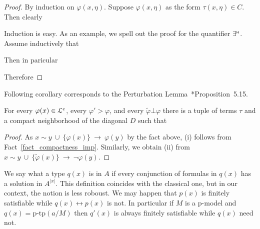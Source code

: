 \documentclass[10pt,oneside]{amsproc}
\renewcommand*{\emph}[1]{%
   \smash{\tikz[baseline]\node[rectangle, fill=teal!25, rounded corners, inner xsep=0.5ex, inner ysep=0.2ex, anchor=base, minimum height = 2.7ex]{\strut #1};}}
\begin{document}
{\begin{proof}
  By induction on $\varphi(x,\eta)$.
  Suppose $\varphi(x,\eta)$ as the form $\tau(x,\eta)\in C$.
  Then clearly
  

  Induction is easy.
  As an example, we spell out the proof for the quantifier $\exists^{\scriptscriptstyle\sf H}$.
  Assume inductively that
  

  Then in paricular 


  Therefore

\end{proof}

Following corollary corresponds to the Perturbation Lemma~\cite{HI}*{Proposition~5.15}.
\begin{corollary}\label{corol_pertubation}
  For every $\varphi(x)\in{\EuScript L}^{\rm c}$, every $\varphi'>\varphi$, and every $\tilde{\varphi}\bot\varphi$ there is a tuple of terms $\tau$ and a compact neighborhood of the diagonal $D$ such that


\end{corollary}

\begin{proof}
  As $x\sim y\ \cup\ \big\{\varphi(x)\big\}\ \rightarrow\ \varphi(y)$ by the fact above, (i) follows from Fact~\ref{fact_compactness_imp}.
  Similarly, we obtain (ii) from $x\sim y\ \cup\ \big\{\tilde{\varphi}(x)\big\}\ \rightarrow\ \neg\varphi(y)$.
\end{proof}



We say what a type $q(x)$ is \emph{finitely satisfiable\/} in $A$ if every conjunction of formulas in $q(x)$ has a solution in $A^{|x|}$.
This definition coincides with the classical one, but in our context, the notion is less roboust.
We may happen that $p(x)$ is finitely satisfiable while $q(x)\leftrightarrow p(x)$ is not.
In particular if $M$ is a p-model and $q(x)=\mbox{p-tp}(a/M)$ then $q'(x)$ is always finitely satisfiable while $q(x)$ need not.

}
\end{document}
